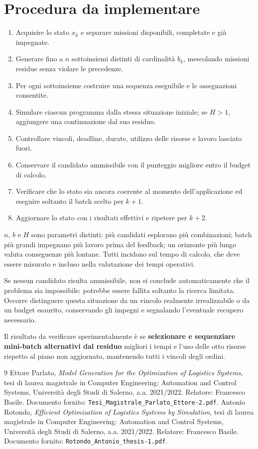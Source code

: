\documentclass[a4paper,11pt]{article}
\begin{document}
\section{Procedura da implementare}

\begin{enumerate}
    \item Acquisire lo stato $x_k$ e separare missioni disponibili, completate e già impegnate.
    \item Generare fino a $n$ sottoinsiemi distinti di cardinalità $b_k$, mescolando missioni residue senza violare le precedenze.
    \item Per ogni sottoinsieme costruire una sequenza eseguibile e le assegnazioni consentite.
    \item Simulare ciascun programma dalla stessa situazione iniziale; se $H>1$, aggiungere una continuazione dal suo residuo.
    \item Controllare vincoli, deadline, durate, utilizzo delle risorse e lavoro lasciato fuori.
    \item Conservare il candidato ammissibile con il punteggio migliore entro il budget di calcolo.
    \item Verificare che lo stato sia ancora coerente al momento dell'applicazione ed eseguire soltanto il batch scelto per $k+1$.
    \item Aggiornare lo stato con i risultati effettivi e ripetere per $k+2$.
\end{enumerate}

$n$, $b$ e $H$ sono parametri distinti: più candidati esplorano più combinazioni; batch più grandi impegnano più lavoro prima del feedback; un orizzonte più lungo valuta conseguenze più lontane. Tutti incidono sul tempo di calcolo, che deve essere misurato e incluso nella valutazione dei tempi operativi.

Se nessun candidato risulta ammissibile, non si conclude automaticamente che il problema sia impossibile: potrebbe essere fallita soltanto la ricerca limitata. Occorre distinguere questa situazione da un vincolo realmente irrealizzabile o da un budget esaurito, conservando gli impegni e segnalando l'eventuale recupero necessario.

Il risultato da verificare sperimentalmente è se \textbf{selezionare e sequenziare mini-batch alternativi dal residuo} migliori i tempi e l'uso delle otto risorse rispetto al piano non aggiornato, mantenendo tutti i vincoli degli ordini.

\begin{thebibliography}{9}
Ettore Parlato, \textit{Model Generation for the Optimization of Logistics Systems}, tesi di laurea magistrale in Computer Engineering: Automation and Control Systems, Universit\`a degli Studi di Salerno, a.a. 2021/2022. Relatore: Francesco Basile. Documento fornito: \texttt{Tesi\_Magistrale\_Parlato\_Ettore-2.pdf}.
Antonio Rotondo, \textit{Efficient Optimization of Logistics Systems by Simulation}, tesi di laurea magistrale in Computer Engineering: Automation and Control Systems, Universit\`a degli Studi di Salerno, a.a. 2021/2022. Relatore: Francesco Basile. Documento fornito: \texttt{Rotondo\_Antonio\_thesis-1.pdf}.
\end{thebibliography}
\end{document}
